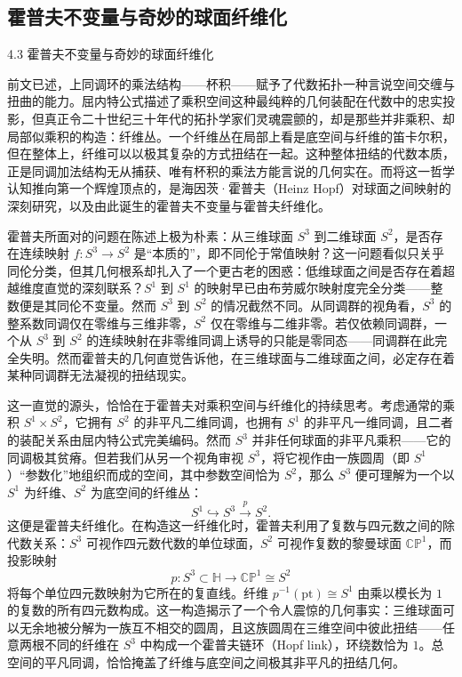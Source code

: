 \documentclass[12pt,a4paper]{article}
\begin{document}
\subsection{霍普夫不变量与奇妙的球面纤维化}

4.3 霍普夫不变量与奇妙的球面纤维化

前文已述，上同调环的乘法结构——杯积——赋予了代数拓扑一种言说空间交缠与扭曲的能力。屈内特公式描述了乘积空间这种最纯粹的几何装配在代数中的忠实投影，但真正令二十世纪三十年代的拓扑学家们灵魂震颤的，却是那些并非乘积、却局部似乘积的构造：纤维丛。一个纤维丛在局部上看是底空间与纤维的笛卡尔积，但在整体上，纤维可以以极其复杂的方式扭结在一起。这种整体扭结的代数本质，正是同调加法结构无从捕获、唯有杯积的乘法方能言说的几何实在。而将这一哲学认知推向第一个辉煌顶点的，是海因茨·霍普夫（Heinz Hopf）对球面之间映射的深刻研究，以及由此诞生的霍普夫不变量与霍普夫纤维化。

霍普夫所面对的问题在陈述上极为朴素：从三维球面 $S^3$ 到二维球面 $S^2$，是否存在连续映射 $f: S^3 \to S^2$ 是“本质的”，即不同伦于常值映射？这一问题看似只关乎同伦分类，但其几何根系却扎入了一个更古老的困惑：低维球面之间是否存在着超越维度直觉的深刻联系？$S^1$ 到 $S^1$ 的映射早已由布劳威尔映射度完全分类——整数便是其同伦不变量。然而 $S^3$ 到 $S^2$ 的情况截然不同。从同调群的视角看，$S^3$ 的整系数同调仅在零维与三维非零，$S^2$ 仅在零维与二维非零。若仅依赖同调群，一个从 $S^3$ 到 $S^2$ 的连续映射在非零维同调上诱导的只能是零同态——同调群在此完全失明。然而霍普夫的几何直觉告诉他，在三维球面与二维球面之间，必定存在着某种同调群无法凝视的扭结现实。

这一直觉的源头，恰恰在于霍普夫对乘积空间与纤维化的持续思考。考虑通常的乘积 $S^1 \times S^2$，它拥有 $S^2$ 的非平凡二维同调，也拥有 $S^1$ 的非平凡一维同调，且二者的装配关系由屈内特公式完美编码。然而 $S^3$ 并非任何球面的非平凡乘积——它的同调极其贫瘠。但若我们从另一个视角审视 $S^3$，将它视作由一族圆周（即 $S^1$）“参数化”地组织而成的空间，其中参数空间恰为 $S^2$，那么 $S^3$ 便可理解为一个以 $S^1$ 为纤维、$S^2$ 为底空间的纤维丛：
$$
S^1 \hookrightarrow S^3 \xrightarrow{p} S^2.
$$
这便是霍普夫纤维化。在构造这一纤维化时，霍普夫利用了复数与四元数之间的除代数关系：$S^3$ 可视作四元数代数的单位球面，$S^2$ 可视作复数的黎曼球面 $\mathbb{C}\mathbb{P}^1$，而投影映射
$$
p: S^3 \subset \mathbb{H} \to \mathbb{C}\mathbb{P}^1 \cong S^2
$$
将每个单位四元数映射为它所在的复直线。纤维 $p^{-1}(\text{pt}) \cong S^1$ 由乘以模长为 $1$ 的复数的所有四元数构成。这一构造揭示了一个令人震惊的几何事实：三维球面可以无余地被分解为一族互不相交的圆周，且这族圆周在三维空间中彼此扭结——任意两根不同的纤维在 $S^3$ 中构成一个霍普夫链环（Hopf link），环绕数恰为 $1$。总空间的平凡同调，恰恰掩盖了纤维与底空间之间极其非平凡的扭结几何。
\end{document}
